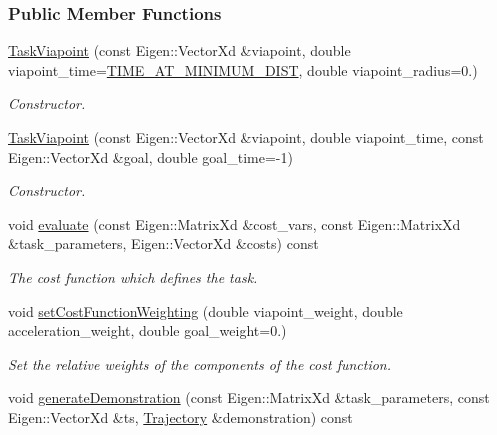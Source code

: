 \subsubsection*{Public Member Functions}
\begin{DoxyCompactItemize}
\item 
\hyperlink{classDmpBbo_1_1TaskViapoint_a381ee9e25f464ddd1e82437dddd9ee79}{Task\+Viapoint} (const Eigen\+::\+Vector\+Xd \&viapoint, double viapoint\+\_\+time=\hyperlink{classDmpBbo_1_1TaskViapoint_a4cdb8b00e89770014fb33674de175a39}{T\+I\+M\+E\+\_\+\+A\+T\+\_\+\+M\+I\+N\+I\+M\+U\+M\+\_\+\+D\+I\+S\+T}, double viapoint\+\_\+radius=0.)
\begin{DoxyCompactList}\small\item\em Constructor. \end{DoxyCompactList}\item 
\hyperlink{classDmpBbo_1_1TaskViapoint_a7a23a9befa5d9f59b33db2ea6dab7bab}{Task\+Viapoint} (const Eigen\+::\+Vector\+Xd \&viapoint, double viapoint\+\_\+time, const Eigen\+::\+Vector\+Xd \&goal, double goal\+\_\+time=-\/1)
\begin{DoxyCompactList}\small\item\em Constructor. \end{DoxyCompactList}\item 
void \hyperlink{classDmpBbo_1_1TaskViapoint_a715d478b0c2d6b896afff04f07e86e3b}{evaluate} (const Eigen\+::\+Matrix\+Xd \&cost\+\_\+vars, const Eigen\+::\+Matrix\+Xd \&task\+\_\+parameters, Eigen\+::\+Vector\+Xd \&costs) const 
\begin{DoxyCompactList}\small\item\em The cost function which defines the task. \end{DoxyCompactList}\item 
void \hyperlink{classDmpBbo_1_1TaskViapoint_a92f8601280e143bde063dc80f47288ed}{set\+Cost\+Function\+Weighting} (double viapoint\+\_\+weight, double acceleration\+\_\+weight, double goal\+\_\+weight=0.)
\begin{DoxyCompactList}\small\item\em Set the relative weights of the components of the cost function. \end{DoxyCompactList}\item 
void \hyperlink{classDmpBbo_1_1TaskViapoint_a046ab7b96b5bd3f6df595dc141c1dad6}{generate\+Demonstration} (const Eigen\+::\+Matrix\+Xd \&task\+\_\+parameters, const Eigen\+::\+Vector\+Xd \&ts, \hyperlink{classDmpBbo_1_1Trajectory}{Trajectory} \&demonstration) const 

\end{DoxyCompactItemize}
